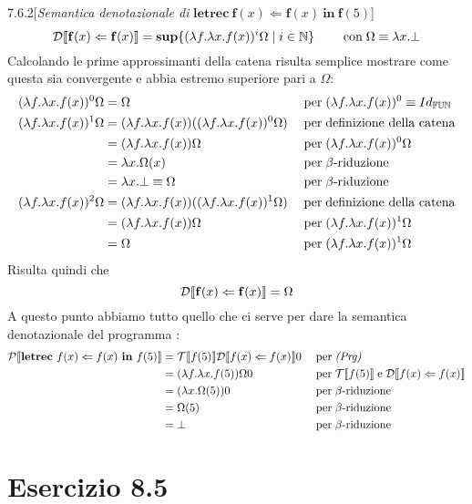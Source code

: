 \begin{customexe}{7.6.2}[\textit{Semantica denotazionale di} $\textbf{letrec} \ \mathbf{f}(x) \Leftarrow \mathbf{f}(x) \ \textbf{in} \ \mathbf{f}(5)$]
\[\mathcal{D} \llbracket \mathbf{f}(x) \Leftarrow \mathbf{f}(x) \rrbracket 
	= \mathbf{sup}\{(\lambda{f}.\lambda{x}.f(x))^i \Omega \mid i \in \mathbb{N} \}
	\qquad \; \text{con} \; \Omega \equiv \lambda{x}.\bot
\]
Calcolando le prime approssimanti della catena risulta semplice mostrare come questa sia convergente e abbia estremo superiore pari a $\Omega$: 
\begin{align*}
(\lambda{f}.\lambda{x}.f(x))^0 \Omega
	&= \Omega 
		&& \; \text{per} \; (\lambda{f}.\lambda{x}.f(x))^0 \equiv Id_{\mathbb{FUN}}\\
(\lambda{f}.\lambda{x}.f(x))^1 \Omega
	&= (\lambda{f}.\lambda{x}.f(x))((\lambda{f}.\lambda{x}.f(x))^0 \Omega) 
		&& \; \text{per} \; \text{definizione della catena}\\
	&= (\lambda{f}.\lambda{x}.f(x)) \Omega 
		&& \; \text{per} \; (\lambda{f}.\lambda{x}.f(x))^0 \Omega \\
	&= \lambda{x}.\Omega(x)
		&& \; \text{per} \; \beta\text{-riduzione} \\
	&= \lambda{x}.\bot \equiv \Omega
		&& \; \text{per} \; \beta\text{-riduzione} \\
(\lambda{f}.\lambda{x}.f(x))^2 \Omega
	&= (\lambda{f}.\lambda{x}.f(x))((\lambda{f}.\lambda{x}.f(x))^1 \Omega) 
		&& \; \text{per} \; \text{definizione della catena} \\
	&= (\lambda{f}.\lambda{x}.f(x)) \Omega
		&& \; \text{per} \; (\lambda{f}.\lambda{x}.f(x))^1 \Omega \\
	&= \Omega
		&& \; \text{per} \; (\lambda{f}.\lambda{x}.f(x))^1 \Omega
\end{align*}
Risulta quindi che \[
\mathcal{D} \llbracket \mathbf{f}(x) \Leftarrow \mathbf{f}(x) \rrbracket = \Omega
\]
A questo punto abbiamo tutto quello che ci serve per dare la semantica denotazionale del programma {\SLF}:
\begin{align*}
\mathcal{P} \doublebracket{\textbf{letrec} \ f(x) \Leftarrow f(x) \ \textbf{in} \ f(5)}
	&= \mathcal{T} \doublebracket{f(5)} \mathcal{D} \doublebracket{f(x) \Leftarrow f(x)} 0
		&& \per \textit{(Prg)} \\
	&= (\lambda{f}.\lambda{x}.f(5)) \Omega 0
		&& \per \mathcal{T} \doublebracket{f(5)} 
		   \e \mathcal{D} \doublebracket{f(x) \Leftarrow f(x)} \\
	&= (\lambda{x}.\Omega(5)) 0
		&& \per \beta\text{-riduzione} \\
	&= \Omega(5)
		&& \per \beta\text{-riduzione} \\
	&= \bot
		&& \per \beta\text{-riduzione}
\end{align*}
\end{customexe}

\section*{Esercizio 8.5}
{}
\label{es:8.5}

